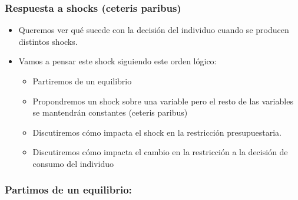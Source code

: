 \documentclass{beamer}
\begin{document}


\begin{frame}
\frametitle{Respuesta a shocks (ceteris paribus)}
\begin{itemize}
    \item Queremos ver qué sucede con la decisión del individuo cuando se producen distintos shocks. \vspace{2mm}
    \item Vamos a pensar este shock siguiendo este orden lógico:
    \begin{itemize}
        \item Partiremos de un equilibrio
        \item Propondremos un shock sobre una variable pero el resto de las variables se mantendrán constantes (ceteris paribus)
        \item Discutiremos cómo impacta el shock en la restricción presupuestaria.      
        \item Discutiremos cómo impacta el cambio en la restricción a la decisión de consumo del individuo
    \end{itemize}
\end{itemize} 
\end{frame}

\begin{frame}
\frametitle{Partimos de un equilibrio:}
\begin{center}
\begin{figure}[H]
\renewcommand{\figurename}{Figure}
\begin{center}
\end{center}
\end{figure}
\end{center}
\end{frame}
\end{document}

